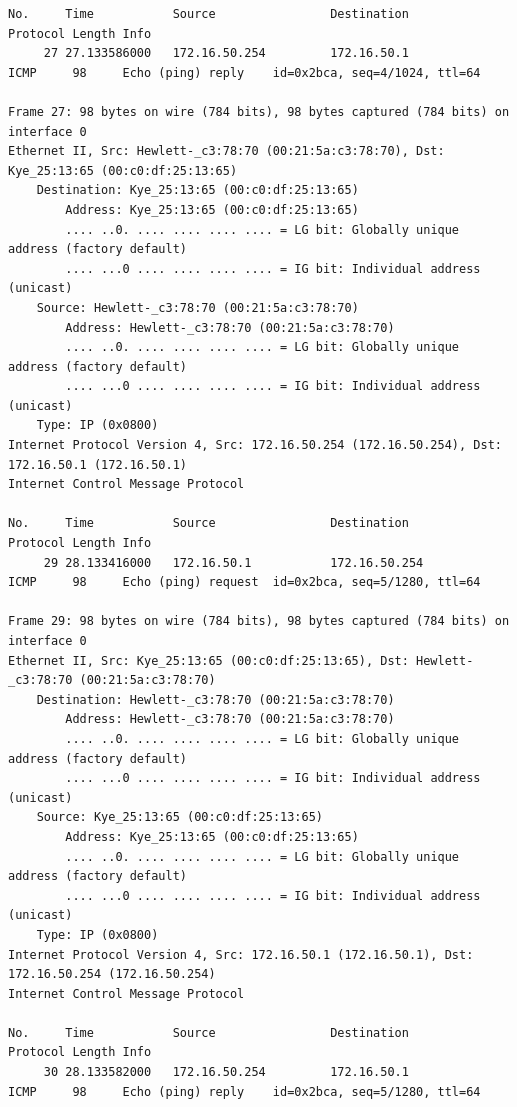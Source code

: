 \documentclass[a4paper,11pt]{article}
\begin{document}
\begin{lstlisting}
No.     Time           Source                Destination           Protocol Length Info
     27 27.133586000   172.16.50.254         172.16.50.1           ICMP     98     Echo (ping) reply    id=0x2bca, seq=4/1024, ttl=64

Frame 27: 98 bytes on wire (784 bits), 98 bytes captured (784 bits) on interface 0
Ethernet II, Src: Hewlett-_c3:78:70 (00:21:5a:c3:78:70), Dst: Kye_25:13:65 (00:c0:df:25:13:65)
    Destination: Kye_25:13:65 (00:c0:df:25:13:65)
        Address: Kye_25:13:65 (00:c0:df:25:13:65)
        .... ..0. .... .... .... .... = LG bit: Globally unique address (factory default)
        .... ...0 .... .... .... .... = IG bit: Individual address (unicast)
    Source: Hewlett-_c3:78:70 (00:21:5a:c3:78:70)
        Address: Hewlett-_c3:78:70 (00:21:5a:c3:78:70)
        .... ..0. .... .... .... .... = LG bit: Globally unique address (factory default)
        .... ...0 .... .... .... .... = IG bit: Individual address (unicast)
    Type: IP (0x0800)
Internet Protocol Version 4, Src: 172.16.50.254 (172.16.50.254), Dst: 172.16.50.1 (172.16.50.1)
Internet Control Message Protocol

No.     Time           Source                Destination           Protocol Length Info
     29 28.133416000   172.16.50.1           172.16.50.254         ICMP     98     Echo (ping) request  id=0x2bca, seq=5/1280, ttl=64

Frame 29: 98 bytes on wire (784 bits), 98 bytes captured (784 bits) on interface 0
Ethernet II, Src: Kye_25:13:65 (00:c0:df:25:13:65), Dst: Hewlett-_c3:78:70 (00:21:5a:c3:78:70)
    Destination: Hewlett-_c3:78:70 (00:21:5a:c3:78:70)
        Address: Hewlett-_c3:78:70 (00:21:5a:c3:78:70)
        .... ..0. .... .... .... .... = LG bit: Globally unique address (factory default)
        .... ...0 .... .... .... .... = IG bit: Individual address (unicast)
    Source: Kye_25:13:65 (00:c0:df:25:13:65)
        Address: Kye_25:13:65 (00:c0:df:25:13:65)
        .... ..0. .... .... .... .... = LG bit: Globally unique address (factory default)
        .... ...0 .... .... .... .... = IG bit: Individual address (unicast)
    Type: IP (0x0800)
Internet Protocol Version 4, Src: 172.16.50.1 (172.16.50.1), Dst: 172.16.50.254 (172.16.50.254)
Internet Control Message Protocol

No.     Time           Source                Destination           Protocol Length Info
     30 28.133582000   172.16.50.254         172.16.50.1           ICMP     98     Echo (ping) reply    id=0x2bca, seq=5/1280, ttl=64


\end{lstlisting}
\end{document}
